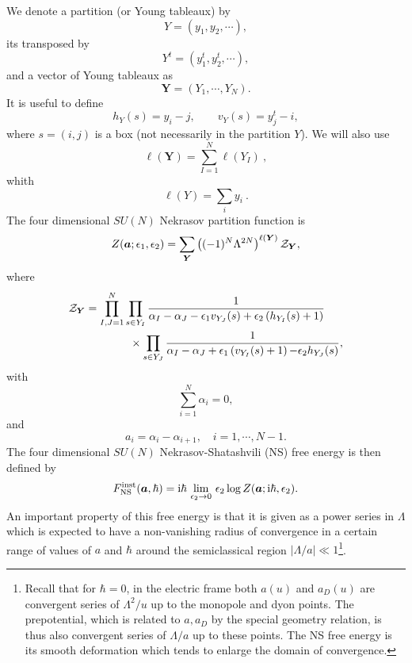 \documentclass[a4paper,11pt]{article}
\theoremstyle{definition}
\newcommand{\CZ}{{\cal Z}}
\newcommand{\ri}{{\rm i}}
\newcommand{\bs}{\boldsymbol}
\newcommand{\be}{\begin{equation}}
\newcommand{\ee}{\end{equation}}
\newcommand{\ba}{\begin{aligned}}
\newcommand{\ea}{\end{aligned}}
\begin{document}
We denote a partition (or  Young tableaux) by
\be Y=(y_1, y_2, \cdots),\ee 
 its transposed by
\be Y^t=(y_1^t, y_2^t, \cdots),\ee
and a vector of Young tableaux as%
\begin{equation}
  \label{Y-vec}
  \boldsymbol{Y}=(Y_1, \cdots, Y_N). 
\end{equation}
%
It is useful to  define
%
\begin{equation}
  h_Y(s)=y_i-j, \qquad v_Y(s)= y^t_j-i, 
\end{equation}
where $ s=(i,j) $ is a  box (not necessarily in the
partition $Y$). We will also use 
%
%
\begin{equation}\label{ly}
  \ell( \boldsymbol{Y})= \sum_{I=1}^N \ell(Y_I) \ ,
\end{equation}
whith
\begin{equation}
  \ell(Y)= \sum_i y_i \ .
\end{equation}
%
The four dimensional   $SU(N)$ Nekrasov partition function is \cite{n, Flume:2002az}
\be
\label{z4d}
Z (\bs{a}; \epsilon_1, \epsilon_2)=\sum_{\boldsymbol{Y}}  \left((-1)^N
  \Lambda^{2N} \right)^{\ell (\boldsymbol{Y})}  \CZ_{\boldsymbol{Y}},  
\ee
%
where 
%
\be
\ba
\label{zdef}\CZ_{\bs{Y}}&=\prod_{I,J=1}^N \prod_{s \in Y_I} {1\over \alpha_I -\alpha_J -\epsilon_1 v_{Y_J}(s) +\epsilon_2 \left( h_{Y_I}(s)+1 \right)} \\
&\qquad \qquad \times  \prod_{s\in Y_J}
{1\over \alpha_I -\alpha_J +\epsilon_1 \left(v_{Y_I}(s)+1\right){-} \epsilon_2 h_{Y_J}(s)},
\ea
\ee
with
\be  \sum_{i=1}^N \alpha_i=0, \ee
and 
\be a_i=\alpha_{i}-\alpha_{i+1} , \quad i=1,\cdots, N-1.\ee
%
The  four dimensional   $SU(N)$ Nekrasov-Shatashvili (NS) free energy is then defined by \cite{ns}
%
\begin{equation}
\label{fns4d}
F_{\rm NS}^{\rm inst}(\bs{a}, \hbar) =\ri \hbar \, \lim_{\epsilon_2
  \rightarrow 0} \, \epsilon_2 \log Z(\bs{a}; \ri \hbar , \epsilon_2).
\end{equation}
%
An important property of this free energy is that it is given as a
power series in $\Lambda$ which is expected to have a non-vanishing
radius of convergence in a certain range of values of $a$ and $\hbar$
around the semiclassical region $|\Lambda/a| \ll 1$\footnote{Recall
  that for $\hbar = 0$, in the electric frame both $a(u)$ and $a_D(u)$
  are convergent series of $\Lambda^2/u$ up to the monopole and dyon
  points.  The prepotential, which is related to $a,a_D$ by the
  special geometry relation, is thus also convergent series of
  $\Lambda/a$ up to these points.  The NS free energy is its smooth
  deformation which tends to enlarge the domain of convergence.}.
 
\end{document}
